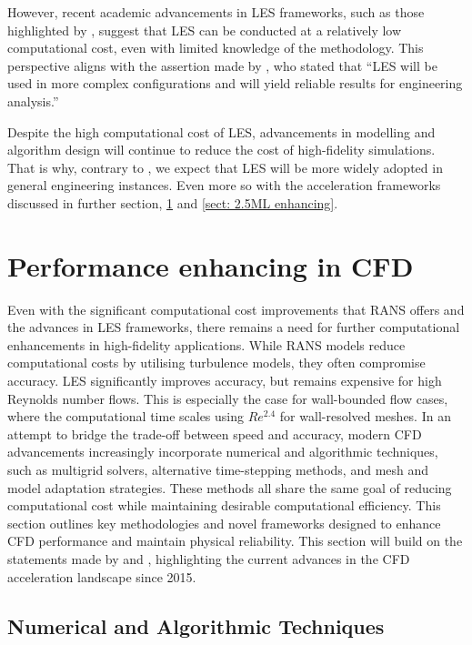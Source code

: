 However, recent academic advancements in LES frameworks, such as those highlighted by \textcite{Weymouth2025}, suggest that LES can be conducted at a relatively low computational cost, even with limited knowledge of the methodology. This perspective aligns with the assertion made by \textcite{Piomelli2014}, who stated that “LES will be used in more complex configurations and will yield reliable results for engineering analysis.”

Despite the high computational cost of LES, advancements in modelling and algorithm design will continue to reduce the cost of high-fidelity simulations. That is why, contrary to \textcite{Zhiyin2015}, we expect that LES will be more widely adopted in general engineering instances. Even more so with the acceleration frameworks discussed in further section, \ref{sect: 2.4performance enhancing} and \ref{sect: 2.5ML enhancing}.

\section{Performance enhancing in CFD}
\label{sect: 2.4performance enhancing}

Even with the significant computational cost improvements that RANS offers and the advances in LES frameworks, there remains a need for further computational enhancements in high-fidelity applications. While RANS models reduce computational costs by utilising turbulence models, they often compromise accuracy. LES significantly improves accuracy, but remains expensive for high Reynolds number flows. This is especially the case for wall-bounded flow cases, where the computational time scales using $Re^{2.4}$ for wall-resolved meshes. In an attempt to bridge the trade-off between speed and accuracy, modern CFD advancements increasingly incorporate numerical and algorithmic techniques, such as multigrid solvers, alternative time-stepping methods, and mesh and model adaptation strategies. These methods all share the same goal of reducing computational cost while maintaining desirable computational efficiency. This section outlines key methodologies and novel frameworks designed to enhance CFD performance and maintain physical reliability. This section will build on the statements made by \textcite{Hosain2015} and \textcite{Afzal2017}, highlighting the current advances in the CFD acceleration landscape since 2015. 

\subsection{Numerical and Algorithmic Techniques}



